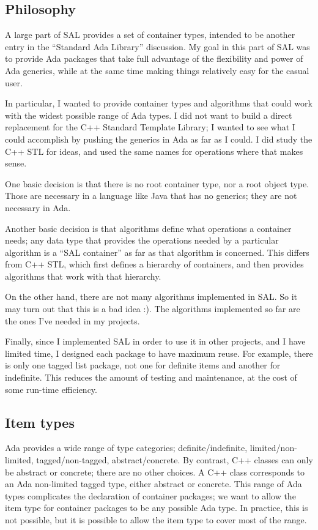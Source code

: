 \documentclass{article}
\begin{document}
\subsection{Philosophy}
A large part of SAL provides a set of container types, intended to be
another entry in the ``Standard Ada Library'' discussion. My goal in
this part of SAL was to provide Ada packages that take full advantage
of the flexibility and power of Ada generics, while at the same time
making things relatively easy for the casual user.

In particular, I wanted to provide container types and algorithms that
could work with the widest possible range of Ada types. I did not want
to build a direct replacement for the C++ Standard Template Library; I
wanted to see what I could accomplish by pushing the generics in Ada
as far as I could. I did study the C++ STL for ideas, and used the
same names for operations where that makes sense.

One basic decision is that there is no root container type, nor a root
object type. Those are necessary in a language like Java that has no
generics; they are not necessary in Ada.

Another basic decision is that algorithms define what operations a
container needs; any data type that provides the operations needed by
a particular algorithm is a ``SAL container'' as far as that algorithm is
concerned. This differs from C++ STL, which first defines a hierarchy
of containers, and then provides algorithms that work with that
hierarchy.

On the other hand, there are not many algorithms implemented in SAL.
So it may turn out that this is a bad idea :). The algorithms
implemented so far are the ones I've needed in my projects.

Finally, since I implemented SAL in order to use it in other projects,
and I have limited time, I designed each package to have maximum
reuse. For example, there is only one tagged list package, not one for
definite items and another for indefinite. This reduces the amount of
testing and maintenance, at the cost of some run-time efficiency.

\subsection{Item types}
Ada provides a wide range of type categories; definite/indefinite,
limited/non-limited, tagged/non-tagged, abstract/concrete. By
contrast, C++ classes can only be abstract or concrete; there are no
other choices. A C++ class corresponds to an Ada non-limited tagged
type, either abstract or concrete. This range of Ada types complicates
the declaration of container packages; we want to allow the item type
for container packages to be any possible Ada type. In practice, this
is not possible, but it is possible to allow the item type to cover
most of the range.
\end{document}
